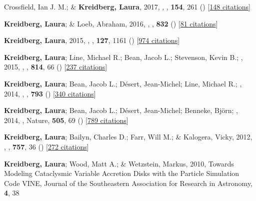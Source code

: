 \item[{\color{numcolor}\scriptsize8}] Crossfield, Ian J. M.; \& \textbf{Kreidberg, Laura}, 2017, , \aj, \textbf{154}, 261 () [\href{https://ui.adsabs.harvard.edu/abs/2017AJ....154..261C}{148 citations}]

\item[{\color{numcolor}\scriptsize7}] \textbf{Kreidberg, Laura}; \& Loeb, Abraham, 2016, , \apj, \textbf{832} () [\href{https://ui.adsabs.harvard.edu/abs/2016ApJ...832L..12K}{81 citations}]

\item[{\color{numcolor}\scriptsize6}] \textbf{Kreidberg, Laura}, 2015, , \pasp, \textbf{127}, 1161 () [\href{https://ui.adsabs.harvard.edu/abs/2015PASP..127.1161K}{974 citations}]

\item[{\color{numcolor}\scriptsize5}] \textbf{Kreidberg, Laura}; Line, Michael R.; Bean, Jacob L.; Stevenson, Kevin B.; \etal, 2015, , \apj, \textbf{814}, 66 () [\href{https://ui.adsabs.harvard.edu/abs/2015ApJ...814...66K}{237 citations}]

\item[{\color{numcolor}\scriptsize4}] \textbf{Kreidberg, Laura}; Bean, Jacob L.; D{\'e}sert, Jean-Michel; Line, Michael R.; \etal, 2014, , \apj, \textbf{793} () [\href{https://ui.adsabs.harvard.edu/abs/2014ApJ...793L..27K}{340 citations}]

\item[{\color{numcolor}\scriptsize3}] \textbf{Kreidberg, Laura}; Bean, Jacob L.; D{\'e}sert, Jean-Michel; Benneke, Bj{\"o}rn; \etal, 2014, , Nature, \textbf{505}, 69 () [\href{https://ui.adsabs.harvard.edu/abs/2014Natur.505...69K}{789 citations}]

\item[{\color{numcolor}\scriptsize2}] \textbf{Kreidberg, Laura}; Bailyn, Charles D.; Farr, Will M.; \& Kalogera, Vicky, 2012, , \apj, \textbf{757}, 36 () [\href{https://ui.adsabs.harvard.edu/abs/2012ApJ...757...36K}{272 citations}]

\item[{\color{numcolor}\scriptsize1}] \textbf{Kreidberg, Laura}; Wood, Matt A.; \& Wetzstein, Markus, 2010, Towards Modeling Cataclysmic Variable Accretion Disks with the Particle Simulation Code VINE, Journal of the Southeastern Association for Research in Astronomy, \textbf{4}, 38